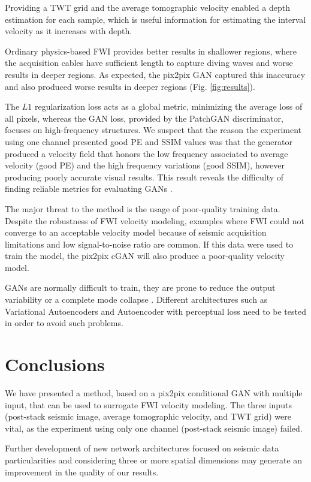 \documentclass[conference]{IEEEtran}
\begin{document}
Providing a TWT grid and the average tomographic velocity enabled a depth estimation for each sample, which is useful information for estimating the interval velocity as it increases with depth.

Ordinary physics-based FWI provides better results in shallower regions, where the acquisition cables have sufficient length to capture diving waves \cite{Zhou2015FullWI} and worse results in deeper regions. As expected, the pix2pix GAN captured this inaccuracy and also produced worse results in deeper regions (Fig. \ref{fig:results}). 

The $L1$ regularization loss acts as a global metric, minimizing the average loss of all pixels, whereas the GAN loss, provided by the PatchGAN discriminator, focuses on high-frequency structures. We suspect that the reason the experiment using one channel presented good PE and SSIM values was that the generator produced a velocity field that honors the low frequency associated to average velocity (good PE) and the high frequency variations (good SSIM), however producing poorly accurate visual results. This result reveals the difficulty of finding reliable metrics for evaluating GANs \cite{Borji2019ProsAC}.

The major threat to the method is the usage of poor-quality training data. Despite the robustness of FWI velocity modeling, examples where FWI could not converge to an acceptable velocity model because of seismic acquisition limitations and low signal-to-noise ratio are common\cite{yao2020review}. If this data were used to train the model, the pix2pix cGAN will also produce a poor-quality velocity model.

GANs are normally difficult to train, they are prone to reduce the output variability or a complete mode collapse \cite{salimans2016improved}. Different architectures such as Variational Autoencoders and Autoencoder with perceptual loss need to be tested in order to avoid such problems.

\section{Conclusions}
We have presented a method, based on a pix2pix conditional GAN with multiple input, that can be used to surrogate FWI velocity modeling. The three inputs (post-stack seismic image, average tomographic velocity, and TWT grid) were vital, as the experiment using only one channel (post-stack seismic image) failed. 

Further development of new network architectures focused on seismic data particularities and considering  three or more spatial dimensions   may generate an improvement in the quality of our results.
\end{document}
